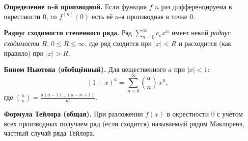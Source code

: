 
\textbf{Определение n-й производной.}
Если функция $f$ $n$ раз дифференцируема в окрестности 0, то $f^{(n)}(0)$ есть её $n$-я производная в точке 0.

\medskip

\textbf{Радиус сходимости степенного ряда.}
Ряд $\sum_{n=0}^{\infty} c_n x^n$ имеет некий \emph{радиус сходимости} $R$, $0\le R\le \infty$, где ряд сходится при $|x|<R$ и расходится (как правило) при $|x|>R$.

\medskip

\textbf{Бином Ньютона (обобщённый).}
Для вещественного $a$ при $|x|<1$:
\[
(1+x)^a = \sum_{n=0}^{\infty} \binom{a}{n}\,x^n,
\]
где $\displaystyle \binom{a}{n} = \frac{a(a-1)\dots(a-n+1)}{n!}$.

\medskip

\textbf{Формула Тейлора (общая).}
При разложении $f(x)$ в окрестности 0 с учётом всех производных получаем ряд (если сходится) называемый рядом Маклорена, частный случай ряда Тейлора.
